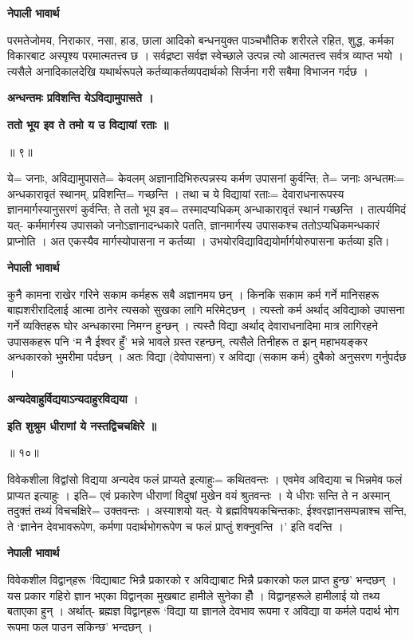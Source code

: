 \documentclass[11pt, a5paper]{article}
\begin{document}
\textbf{नेपाली भावार्थ}

परमतेजोमय, निराकार, नसा, हाड, छाला आदिको बन्धनयुक्त पाञ्चभौतिक शरीरले रहित, शुद्ध, कर्मका विकारबाट अस्पृश्य परमात्मतत्त्व छ । सर्वद्रष्टा सर्वज्ञ स्वेच्छाले उत्पन्न त्यो आत्मतत्त्व सर्वत्र व्याप्त भयो । त्यसैले अनादिकालदेखि यथार्थरूपले कर्तव्याकर्तव्यपदार्थको सिर्जना गरी सबैमा विभाजन गर्दछ ।

\textbf{अन्धन्तमः प्रविशन्ति येऽविद्यामुपासते ।}

\textbf{ततो भूय इव ते तमो य उ विद्यायां रताः ॥}

॥ ९॥

ये= जनाः, अविद्यामुपासते= केवलम् अज्ञानादिभिरुत्पन्नस्य कर्मण उपासनां कुर्वन्ति; ते‍= जनाः अन्धतमः= अन्धकारावृतं स्थानम्, प्रविशन्ति= गच्छन्ति । तथा च ये विद्यायां रताः= देवाराधनारूपस्य ज्ञानमार्गस्यानुसरणं कुर्वन्ति; ते ततो भूय इव= तस्मादप्यधिकम् अन्धाकारावृतं स्थानं गच्छन्ति । तात्पर्यमिदं यत्- कर्ममार्गस्य उपासको जनोऽज्ञानादन्धकारे पतति, ज्ञानमार्गस्य उपासकश्च ततोऽप्यधिकमन्धकारं प्राप्नोति । अत एकस्यैव मार्गस्योपासना न कर्तव्या । उभयोरविद्याविद्ययोर्मार्गयोरुपासना कर्तव्या इति।

\textbf{नेपाली भावार्थ}

कुनै कामना राखेर गरिने सकाम कर्महरू सबै अज्ञानमय छन् । किनकि सकाम कर्म गर्ने मानिसहरू बाह्यशरीरादिलाई आत्मा ठानेर त्यसको सुखका लागि मरिमेट्‌छन् । त्यस्तो कर्म अर्थाद् अविद्याको उपासना गर्ने व्यक्तिहरू घोर अन्धकारमा निमग्न हुन्छन् । त्यस्तै विद्या अर्थाद् देवाराधनादिमा मात्र लागिरहने उपासकहरू पनि ‘म नै ईश्वर हुँ’ भन्ने भावले ग्रस्त रहन्छन्, त्यसैले तिनीहरू त झन् महाभयङ्‌कर अन्धकारको भुमरीमा पर्दछन् । अतः विद्या (देवोपासना) र अविद्या (सकाम कर्म) दुबैको अनुसरण गर्नुपर्दछ ।

\textbf{अन्यदेवाहुर्विद्ययाऽन्यदाहुरविद्यया} ।

\textbf{इति शुश्रुम धीराणां ये  नस्तद्विचचक्षिरे ॥}

॥ १०॥

विवेकशीला विद्वांसो विद्यया अन्यदेव फलं प्राप्यते इत्याहुः= कथितवन्तः । एवमेव अविद्यया च भिन्नमेव फलं प्राप्यत इत्याहुः । इति= एवं प्रकारेण धीराणां विदुषां मुखेन वयं श्रुतवन्तः । ये धीराः सन्ति ते न अस्मान् तदुक्तं तथ्यं विचचक्षिरे= उक्तवन्तः । अस्याशयो यत्- ये ब्रह्मविषयकचिन्तकाः, ईश्वरज्ञानसम्पन्नाश्च सन्ति, ते ‘ज्ञानेन देवभावरूपेण, कर्मणा पदार्थभोगरूपेण च फलं प्राप्तुं शक्नुवन्ति ।’ इति वदन्ति ।

\textbf{नेपाली भावार्थ}

विवेकशील विद्वान्‌हरू ‘विद्याबाट भिन्नै प्रकारको र अविद्याबाट भिन्नै प्रकारको फल प्राप्त हुन्छ’ भन्दछन् । यस प्रकार गहिरो ज्ञान भएका विद्वान्‌का मुखबाट हामीले सुनेका हौँ । विद्वान्‌हरूले हामीलाई यो तथ्य बताएका हुन् । अर्थात्- ब्रह्मज्ञ विद्वान्‌हरू ‘विद्या या ज्ञानले देवभाव रूपमा र अविद्या वा कर्मले पदार्थ भोग रूपमा फल पाउन सकिन्छ’ भन्दछन् ।
\end{document}

